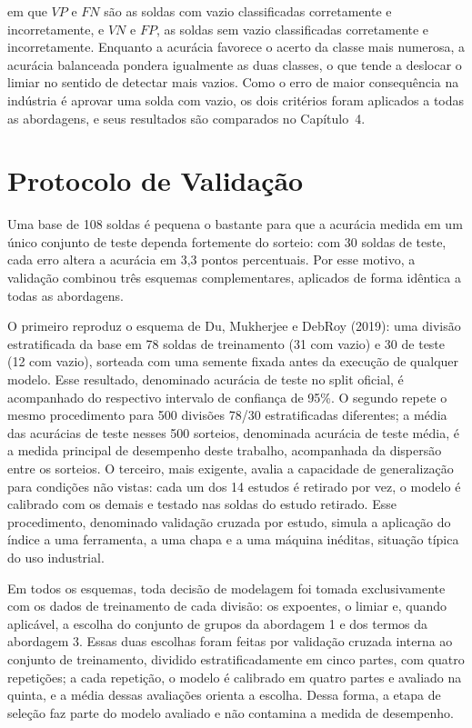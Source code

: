 \documentclass[12pt,openany]{report}
\begin{document}
\noindent em que $VP$ e $FN$ são as soldas com vazio classificadas corretamente e incorretamente, e $VN$ e $FP$, as soldas sem vazio classificadas corretamente e incorretamente. Enquanto a acurácia favorece o acerto da classe mais numerosa, a acurácia balanceada pondera igualmente as duas classes, o que tende a deslocar o limiar no sentido de detectar mais vazios. Como o erro de maior consequência na indústria é aprovar uma solda com vazio, os dois critérios foram aplicados a todas as abordagens, e seus resultados são comparados no Capítulo~4.

\section{Protocolo de Validação}
\label{sec:validacao}

Uma base de 108 soldas é pequena o bastante para que a acurácia medida em um único conjunto de teste dependa fortemente do sorteio: com 30 soldas de teste, cada erro altera a acurácia em 3,3 pontos percentuais. Por esse motivo, a validação combinou três esquemas complementares, aplicados de forma idêntica a todas as abordagens.

O primeiro reproduz o esquema de Du, Mukherjee e DebRoy (2019): uma divisão estratificada da base em 78 soldas de treinamento (31 com vazio) e 30 de teste (12 com vazio), sorteada com uma semente fixada antes da execução de qualquer modelo. Esse resultado, denominado acurácia de teste no split oficial, é acompanhado do respectivo intervalo de confiança de 95\%. O segundo repete o mesmo procedimento para 500 divisões 78/30 estratificadas diferentes; a média das acurácias de teste nesses 500 sorteios, denominada acurácia de teste média, é a medida principal de desempenho deste trabalho, acompanhada da dispersão entre os sorteios. O terceiro, mais exigente, avalia a capacidade de generalização para condições não vistas: cada um dos 14 estudos é retirado por vez, o modelo é calibrado com os demais e testado nas soldas do estudo retirado. Esse procedimento, denominado validação cruzada por estudo, simula a aplicação do índice a uma ferramenta, a uma chapa e a uma máquina inéditas, situação típica do uso industrial.

Em todos os esquemas, toda decisão de modelagem foi tomada exclusivamente com os dados de treinamento de cada divisão: os expoentes, o limiar e, quando aplicável, a escolha do conjunto de grupos da abordagem 1 e dos termos da abordagem 3. Essas duas escolhas foram feitas por validação cruzada interna ao conjunto de treinamento, dividido estratificadamente em cinco partes, com quatro repetições; a cada repetição, o modelo é calibrado em quatro partes e avaliado na quinta, e a média dessas avaliações orienta a escolha. Dessa forma, a etapa de seleção faz parte do modelo avaliado e não contamina a medida de desempenho.
\end{document}
